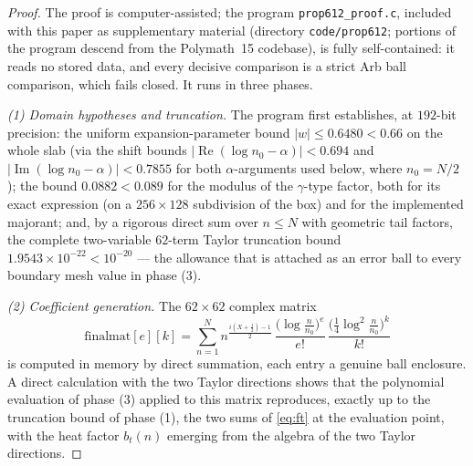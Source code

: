 \documentclass[11pt]{article}
\theoremstyle{definition}
\DeclareMathOperator{\Rea}{Re}
\DeclareMathOperator{\Ima}{Im}
\begin{document}
\begin{proof}
The proof is computer-assisted; the program
\texttt{prop612\_proof.c}, included with this paper as
supplementary material (directory \texttt{code/prop612}; portions
of the program descend from the Polymath~15 codebase), is fully
self-contained: it reads no stored data, and every decisive
comparison is a strict Arb ball comparison, which fails closed. It
runs in three phases.

\emph{(1) Domain hypotheses and truncation.} The program first
establishes, at $192$-bit precision: the uniform
expansion-parameter
bound $|w|\le0.6480<0.66$ on the whole slab (via the shift bounds
$|\Rea(\log n_0-\alpha)|<0.694$ and $|\Ima(\log n_0-\alpha)|<0.7855$
for both $\alpha$-arguments used below, where $n_0=N/2$); the bound
$0.0882<0.089$ for the modulus of the $\gamma$-type factor, both
for its exact expression (on a $256\times128$ subdivision of the
box) and for the implemented majorant; and, by a rigorous direct
sum over $n\le N$ with geometric tail factors, the complete
two-variable $62$-term Taylor truncation bound
$1.9543\times10^{-22}<10^{-20}$ --- the allowance that is attached
as an error ball to every boundary mesh value in phase (3).

\emph{(2) Coefficient generation.} The $62\times62$ complex matrix
\[
\mathrm{finalmat}[e][k]
=\sum_{n=1}^{N}n^{\frac{i(X+\frac12)-1}{2}}
\,\frac{\bigl(\log\frac n{n_0}\bigr)^e}{e!}
\,\frac{\bigl(\frac14\log^2\frac n{n_0}\bigr)^k}{k!}
\]
is computed in memory by direct summation, each entry a genuine
ball enclosure. A direct calculation with the two Taylor
directions shows that the
polynomial evaluation of phase (3) applied to this matrix
reproduces, exactly up to the truncation bound of phase (1),
the two sums of \eqref{eq:ft} at the evaluation point, with the
heat factor $b_t(n)$ emerging from the algebra of the two Taylor
directions.


\end{proof}
\end{document}
